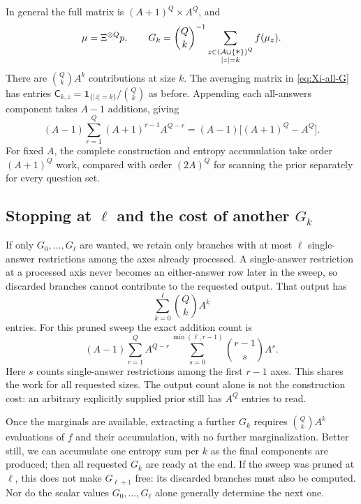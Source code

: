 \documentclass[11pt]{article}
\newcommand{\wild}{\mathord{\text{\normalsize$\ast$}}}
\begin{document}
In general the full matrix is $(A+1)^Q\times A^Q$, and
\begin{equation}\label{eq:Xi-Gk-alphabet}
  \mu=\Xi^{\otimes Q}p,
  \qquad
  G_k=\binom Qk^{-1}
       \sum_{\substack{z\in(\mathcal A\cup\{\wild\})^Q\\|z|=k}}f(\mu_z).
\end{equation}
There are $\binom Qk A^k$ contributions at size $k$. The averaging matrix
in \eqref{eq:Xi-all-G} has entries
$\mathsf C_{k,z}=\mathbf1_{\{|z|=k\}}/\binom Qk$ as before.
Appending each all-answers component takes $A-1$ additions, giving
\begin{equation}\label{eq:Xi-alphabet-cost}
  (A-1)\sum_{r=1}^Q(A+1)^{r-1}A^{Q-r}
  =(A-1)\big[(A+1)^Q-A^Q\big].
\end{equation}
For fixed $A$, the complete construction and entropy accumulation take
order $(A+1)^Q$ work, compared with order $(2A)^Q$ for scanning the prior
separately for every question set.

\subsection{Stopping at $\ell$ and the cost of another $G_k$}
If only $G_0,\ldots,G_\ell$ are wanted, we retain only branches with
at most $\ell$ single-answer restrictions among the axes already processed.
A single-answer restriction at a processed axis never becomes an either-answer row later
in the sweep, so discarded branches cannot contribute to the
requested output. That output has
\begin{equation}
  \sum_{k=0}^{\ell}\binom Qk A^k
\end{equation}
entries. For this pruned sweep the exact addition count is
\begin{equation}\label{eq:Xi-truncated-cost}
  (A-1)\sum_{r=1}^Q A^{Q-r}
    \sum_{s=0}^{\min(\ell,r-1)}\binom{r-1}{s}A^s.
\end{equation}
Here $s$ counts single-answer restrictions among the first $r-1$ axes.
This shares the work for all requested sizes. The output count
alone is not the construction cost: an arbitrary explicitly
supplied prior still has $A^Q$ entries to read.

Once the marginals are available, extracting a further $G_k$
requires $\binom Qk A^k$ evaluations of $f$ and their accumulation,
with no further marginalization. Better still, we can accumulate one
entropy sum per $k$ as the final components are produced; then
all requested $G_k$ are ready at the end. If the sweep was pruned
at $\ell$, this does not make $G_{\ell+1}$ free: its discarded
branches must also be computed. Nor do the scalar values
$G_0,\ldots,G_\ell$ alone generally determine the next one.
\end{document}
